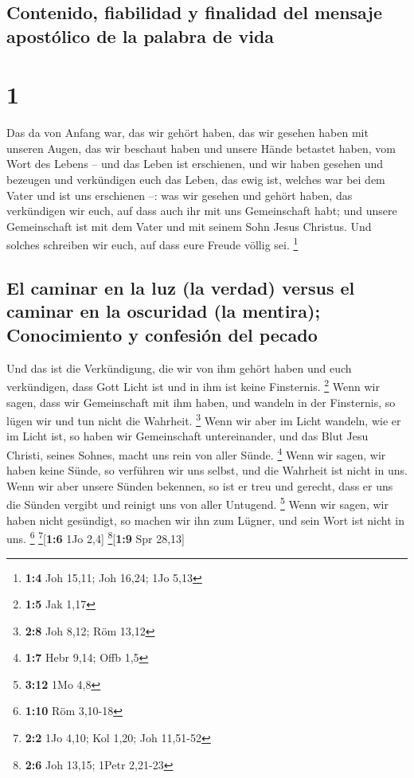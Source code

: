 \hypertarget{contenido-fiabilidad-y-finalidad-del-mensaje-apostuxf3lico-de-la-palabra-de-vida}{%
\subsection{Contenido, fiabilidad y finalidad del mensaje apostólico de
la palabra de
vida}\label{contenido-fiabilidad-y-finalidad-del-mensaje-apostuxf3lico-de-la-palabra-de-vida}}

\hypertarget{section}{%
\section{1}\label{section}}

 Das da von Anfang war, das wir gehört haben, das wir
gesehen haben mit unseren Augen, das wir beschaut haben und unsere Hände
betastet haben, vom Wort des Lebens --  und das Leben ist
erschienen, und wir haben gesehen und bezeugen und verkündigen euch das
Leben, das ewig ist, welches war bei dem Vater und ist uns erschienen
--:  was wir gesehen und gehört haben, das verkündigen wir
euch, auf dass auch ihr mit uns Gemeinschaft habt; und unsere
Gemeinschaft ist mit dem Vater und mit seinem Sohn Jesus Christus.
 Und solches schreiben wir euch, auf dass eure Freude
völlig sei. \footnote{\textbf{1:4} Joh 15,11; Joh 16,24; 1Jo 5,13}

\hypertarget{el-caminar-en-la-luz-la-verdad-versus-el-caminar-en-la-oscuridad-la-mentira-conocimiento-y-confesiuxf3n-del-pecado}{%
\subsection{El caminar en la luz (la verdad) versus el caminar en la
oscuridad (la mentira); Conocimiento y confesión del
pecado}\label{el-caminar-en-la-luz-la-verdad-versus-el-caminar-en-la-oscuridad-la-mentira-conocimiento-y-confesiuxf3n-del-pecado}}

 Und das ist die Verkündigung, die wir von ihm gehört
haben und euch verkündigen, dass Gott Licht ist und in ihm ist keine
Finsternis. \footnote{\textbf{1:5} Jak 1,17}  Wenn wir
sagen, dass wir Gemeinschaft mit ihm haben, und wandeln in der
Finsternis, so lügen wir und tun nicht die Wahrheit. \footnote{\textbf{2:8}
  Joh 8,12; Röm 13,12}  Wenn wir aber im Licht wandeln,
wie er im Licht ist, so haben wir Gemeinschaft untereinander, und das
Blut Jesu Christi, seines Sohnes, macht uns rein von aller Sünde.
\footnote{\textbf{1:7} Hebr 9,14; Offb 1,5}  Wenn wir
sagen, wir haben keine Sünde, so verführen wir uns selbst, und die
Wahrheit ist nicht in uns.  Wenn wir aber unsere Sünden
bekennen, so ist er treu und gerecht, dass er uns die Sünden vergibt und
reinigt uns von aller Untugend. \footnote{\textbf{3:12} 1Mo 4,8}
 Wenn wir sagen, wir haben nicht gesündigt, so machen wir
ihn zum Lügner, und sein Wort ist nicht in uns. \footnote{\textbf{1:10}
  Röm 3,10-18} \footnote{\textbf{2:2} 1Jo 4,10; Kol 1,20; Joh 11,51-52}{[}\textbf{1:6}
1Jo 2,4{]} \footnote{\textbf{2:6} Joh 13,15; 1Petr 2,21-23}{[}\textbf{1:9}
Spr 28,13{]}

